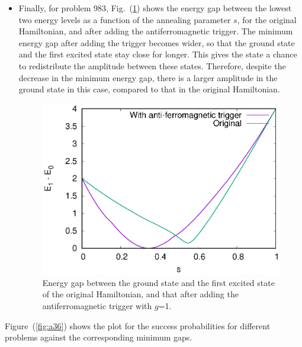 \documentclass[../main.tex]{subfiles}
\begin{document}
\begin{itemize}
\item  Finally, for problem 983, Fig.~(\ref{fig:a51}) shows the energy gap between the lowest two energy levels as a function of the annealing parameter $s$, for the original Hamiltonian, and after adding the antiferromagnetic trigger. The minimum energy gap after adding the trigger becomes wider, so that the ground state and the first excited state stay close for longer. This gives the state a chance to redistribute the amplitude between these states. Therefore, despite the decrease in the minimum energy gap, there is a larger amplitude in the ground state in this case, compared to that in the original Hamiltonian.

\begin{figure}[H]
  \centering
  \includegraphics[scale=0.8]{983_Mingap.eps}

\caption{Energy gap between the ground state and the first excited state of the original Hamiltonian, and that after adding the antiferromagnetic trigger with $g$=1.}
  \label{fig:a51}
\end{figure}
\end{itemize}

Figure~(\ref{fig:a36}) shows the plot for the success probabilities for different problems against the corresponding minimum gaps.
\end{document}
